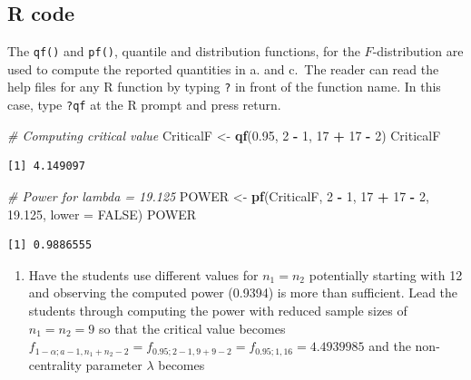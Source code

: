 \documentclass[
]{article}
\newenvironment{Shaded}{\begin{snugshade}}{\end{snugshade}}
\newcommand{\AttributeTok}[1]{\textcolor[rgb]{0.13,0.29,0.53}{#1}}
\newcommand{\CommentTok}[1]{\textcolor[rgb]{0.56,0.35,0.01}{\textit{#1}}}
\newcommand{\ConstantTok}[1]{\textcolor[rgb]{0.56,0.35,0.01}{#1}}
\newcommand{\DecValTok}[1]{\textcolor[rgb]{0.00,0.00,0.81}{#1}}
\newcommand{\FloatTok}[1]{\textcolor[rgb]{0.00,0.00,0.81}{#1}}
\newcommand{\FunctionTok}[1]{\textcolor[rgb]{0.13,0.29,0.53}{\textbf{#1}}}
\newcommand{\NormalTok}[1]{#1}
\newcommand{\OtherTok}[1]{\textcolor[rgb]{0.56,0.35,0.01}{#1}}
\newcommand{\SpecialCharTok}[1]{\textcolor[rgb]{0.81,0.36,0.00}{\textbf{#1}}}
\providecommand{\tightlist}{%
  \setlength{\itemsep}{0pt}\setlength{\parskip}{0pt}}
\begin{document}
\subsection*{R code}\label{r-code}

The \texttt{qf()} and \texttt{pf()}, quantile and distribution functions, for the \(F\)-distribution are used to compute the reported quantities in a. and c.~The reader can read the help files for any R function by typing \texttt{?} in front of the function name. In this case, type \texttt{?qf} at the R prompt and press return.

\begin{Shaded}
\begin{Highlighting}[]
\CommentTok{\# Computing critical value}
\NormalTok{CriticalF }\OtherTok{\textless{}{-}} \FunctionTok{qf}\NormalTok{(}\FloatTok{0.95}\NormalTok{, }\DecValTok{2} \SpecialCharTok{{-}} \DecValTok{1}\NormalTok{, }\DecValTok{17} \SpecialCharTok{+} \DecValTok{17} \SpecialCharTok{{-}} \DecValTok{2}\NormalTok{)}
\NormalTok{CriticalF}
\end{Highlighting}
\end{Shaded}

\begin{verbatim}
[1] 4.149097
\end{verbatim}

\begin{Shaded}
\begin{Highlighting}[]
\CommentTok{\# Power for lambda = 19.125}
\NormalTok{POWER }\OtherTok{\textless{}{-}} \FunctionTok{pf}\NormalTok{(CriticalF, }\DecValTok{2} \SpecialCharTok{{-}} \DecValTok{1}\NormalTok{, }\DecValTok{17} \SpecialCharTok{+} \DecValTok{17} \SpecialCharTok{{-}} \DecValTok{2}\NormalTok{, }\FloatTok{19.125}\NormalTok{, }\AttributeTok{lower =} \ConstantTok{FALSE}\NormalTok{)}
\NormalTok{POWER}
\end{Highlighting}
\end{Shaded}

\begin{verbatim}
[1] 0.9886555
\end{verbatim}

\begin{enumerate}
\def\labelenumi{\alph{enumi})}
\setcounter{enumi}{3}
\tightlist
\item
  Have the students use different values for \(n_1 = n_2\) potentially starting with 12 and observing the computed power (0.9394) is more than sufficient. Lead the students through computing the power with reduced sample sizes of \(n_1 = n_2 = 9\) so that the critical value becomes \(f_{1 - \alpha; a - 1, n_1 + n_2 -2} = f_{0.95; 2 - 1, 9 + 9 -2} = f_{0.95; 1, 16} = 4.4939985\) and the non-centrality parameter \(\lambda\) becomes
\end{enumerate}
\end{document}
